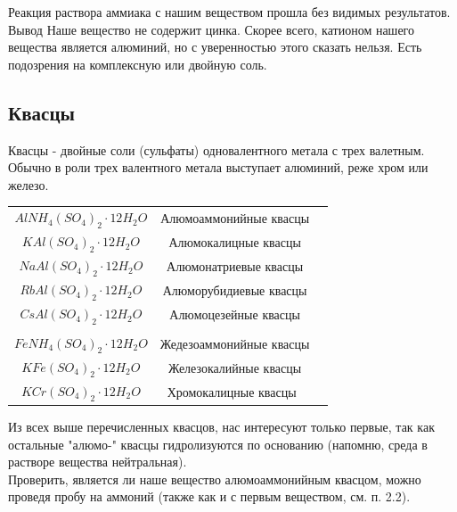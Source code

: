 \documentclass[a4paper,14pt,notitlepage,twoside]{article}
\begin{document}
            Реакция раствора аммиака с нашим веществом прошла без видимых 
            результатов.\\
    
            Вывод\newline
            Наше вещество не содержит цинка. Скорее всего, катионом 
            нашего вещества является алюминий, но с уверенностью этого сказать нельзя.
            Есть подозрения на комплексную или двойную соль.

        \newpage
        \subsection{Квасцы}
            Квасцы - двойные соли (сульфаты) одновалентного метала с трех валетным.
            Обычно в роли трех валентного метала выступает алюминий, реже хром или железо.\\
                
            \begin{center}
                \begin{tabular}{ccc}
                    $AlNH_4(SO_4)_2 \cdot 12H_2O$ & Алюмоаммонийные квасцы\\
                    $KAl(SO_4)_2 \cdot 12H_2O$ & Алюмокалицные квасцы\\
                    $NaAl(SO_4)_2 \cdot 12H_2O$ & Алюмонатриевые квасцы\\
                    $RbAl(SO_4)_2 \cdot 12H_2O$ & Алюморубидиевые квасцы\\
                    $CsAl(SO_4)_2 \cdot 12H_2O$ & Алюмоцезейные квасцы\\\\
                    $FeNH_4(SO_4)_2 \cdot 12H_2O$ & Жедезоаммонийные квасцы\\
                    $KFe(SO_4)_2 \cdot 12H_2O$ & Железокалийные квасцы\\
                    $KCr(SO_4)_2 \cdot 12H_2O$ & Хромокалицные квасцы\
                \end{tabular}   
                \end{center}

            Из всех выше перечисленных квасцов, нас интересуют только первые,
            так как остальные "алюмо-" {}квасцы гидролизуются по основанию 
            (напомню, среда в растворе вещества нейтральная).\\

            Проверить, является ли наше вещество алюмоаммонийным квасцом, можно
            проведя пробу на аммоний (также как и с первым веществом, см. п. 2.2).\\
            
\end{document}
